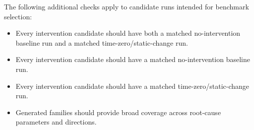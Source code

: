 \documentclass[11pt]{article}
\begin{document}
The following additional checks apply to candidate runs intended for benchmark selection:

\begin{itemize}
 \item Every intervention candidate should have both a matched no-intervention baseline run and a matched time-zero/static-change run.
\item Every intervention candidate should have a matched no-intervention baseline run.
\item Every intervention candidate should have a matched time-zero/static-change run.
\item Generated families should provide broad coverage across root-cause parameters and directions.
\end{itemize}
\end{document}
